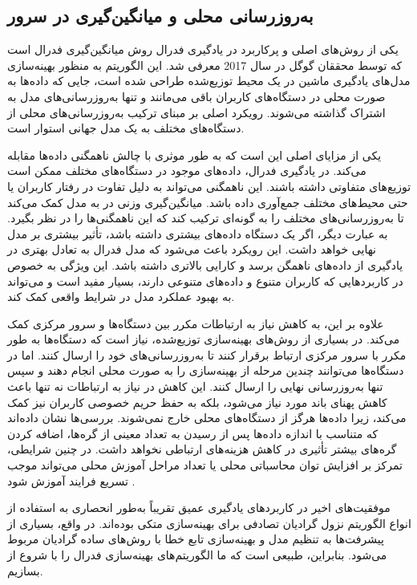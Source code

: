 \subsection{به‌روزرسانی محلی و میانگین‌گیری در سرور}
یکی از روش‌های اصلی و پرکاربرد در یادگیری فدرال روش میانگین‌گیری فدرال%
است که توسط محققان گوگل در سال 2017 معرفی شد. این الگوریتم به منظور بهینه‌سازی مدل‌های یادگیری ماشین در یک محیط توزیع‌شده طراحی شده است، جایی که داده‌ها به صورت محلی در دستگاه‌های کاربران باقی می‌مانند و تنها به‌روزرسانی‌های مدل به اشتراک گذاشته می‌شوند. رویکرد اصلی
بر مبنای ترکیب به‌روزرسانی‌های محلی از دستگاه‌های مختلف به یک مدل جهانی استوار است.

یکی از مزایای اصلی
این است که به طور موثری با چالش ناهمگنی داده‌ها مقابله می‌کند. در یادگیری فدرال، داده‌های موجود در دستگاه‌های مختلف ممکن است توزیع‌های متفاوتی داشته باشند. این ناهمگنی می‌تواند به دلیل تفاوت در رفتار کاربران یا حتی محیط‌های مختلف جمع‌آوری داده باشد. میانگین‌گیری وزنی در
به مدل کمک می‌کند تا به‌روزرسانی‌های مختلف را به گونه‌ای ترکیب کند که این ناهمگنی‌ها را در نظر بگیرد. به عبارت دیگر، اگر یک دستگاه داده‌های بیشتری داشته باشد، تأثیر بیشتری بر مدل نهایی خواهد داشت. این رویکرد باعث می‌شود که مدل فدرال به تعادل بهتری در یادگیری از داده‌های ناهمگن برسد و کارایی بالاتری داشته باشد. این ویژگی به خصوص در کاربردهایی که کاربران متنوع و داده‌های متنوعی دارند، بسیار مفید است و می‌تواند به بهبود عملکرد مدل در شرایط واقعی کمک کند.

علاوه بر این،
به کاهش نیاز به ارتباطات مکرر بین دستگاه‌ها و سرور مرکزی کمک می‌کند. در بسیاری از روش‌های بهینه‌سازی توزیع‌شده، نیاز است که دستگاه‌ها به طور مکرر با سرور مرکزی ارتباط برقرار کنند تا به‌روزرسانی‌های خود را ارسال کنند. اما در
دستگاه‌ها می‌توانند چندین مرحله از بهینه‌سازی را به صورت محلی انجام دهند و سپس تنها به‌روزرسانی نهایی را ارسال کنند. این کاهش در نیاز به ارتباطات نه تنها باعث کاهش پهنای باند مورد نیاز می‌شود، بلکه به حفظ حریم خصوصی کاربران نیز کمک می‌کند، زیرا داده‌ها هرگز از دستگاه‌های محلی خارج نمی‌شوند. بررسی‌ها نشان داده‌اند که متناسب با اندازه داده‌ها پس از رسیدن به تعداد معینی از گره‌ها، اضافه کردن گره‌های بیشتر تأثیری در کاهش هزینه‌های ارتباطی نخواهد داشت. در چنین شرایطی، تمرکز بر افزایش توان محاسباتی محلی یا تعداد مراحل آموزش محلی می‌تواند موجب تسریع فرایند آموزش شود
\cite{mcmahan2017communication}.

موفقیت‌های اخیر در کاربردهای یادگیری عمیق تقریباً به‌طور انحصاری به استفاده از انواع الگوریتم نزول گرادیان تصادفی%
برای بهینه‌سازی متکی بوده‌اند. در واقع، بسیاری از پیشرفت‌ها به تنظیم مدل و بهینه‌سازی تابع خطا با روش‌های ساده گرادیان مربوط می‌شود. بنابراین، طبیعی است که ما الگوریتم‌های بهینه‌سازی فدرال را با شروع از
بسازیم.

